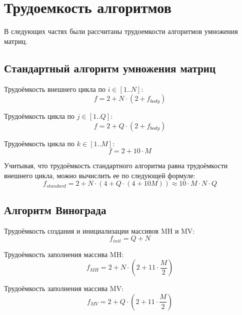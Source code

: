 \section{Трудоемкость алгоритмов}

В следующих частях были рассчитаны трудоемкости алгоритмов умножения матриц.

\subsection{Стандартный алгоритм умножения матриц}

Трудоёмкость внешнего цикла по $i \in [1..N]$:
\begin{equation}
	\label{for:xxxxx}
	f = 2 + N \cdot (2 + f_{body})
\end{equation}

Трудоёмкость цикла по $j \in [1..Q]$:
\begin{equation}
	\label{for:yyyyy}
	f = 2 + Q \cdot (2 + f_{body})
\end{equation}

Трудоёмкость цикла по $k \in [1..M]$:
\begin{equation}
	\label{for:yyyyy}
	f = 2 + 10\cdot M
\end{equation}

Учитывая, что трудоёмкость стандартного алгоритма равна трудоёмкости внешнего цикла, можно вычислить ее по следующей формуле:
\begin{equation}
	\label{for:standard}
	f_{standard} = 2 + N \cdot (4 + Q \cdot (4 + 10M)) \approx 10\cdot M\cdot N\cdot Q
\end{equation}

\subsection{Алгоритм Винограда}

Трудоёмкость создания и инициализации массивов MH и MV:
\begin{equation}
	\label{for:init}
	f_{init} = Q + N
\end{equation}

Трудоёмкость заполнения массива MH:
\begin{equation}
	\label{for:MH}
	f_{MH} = 2 + N\cdot(2 + 11\cdot \frac{M}{2})
\end{equation}

Трудоёмкость заполнения массива MV:
\begin{equation}
	\label{for:MV}
	f_{MV} = 2 + Q\cdot(2 +11\cdot \frac{M}{2})
\end{equation}
	
